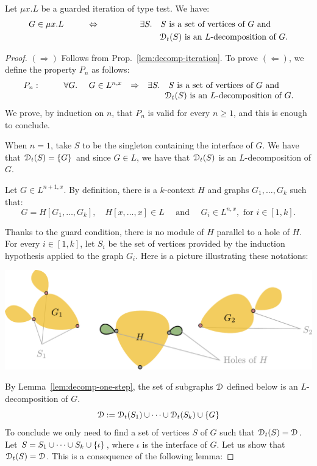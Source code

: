 \begin{proposition}\label{prop:decomp-iteration-test} Let  $\mu x. L$ be a guarded iteration of type test. We have:
$$\begin{array}{rll}
  G\in \mu x. L& \qquad\Leftrightarrow \qquad\qquad& \exists S.\quad  S \text{ is a set of vertices of $G$ and }\\[3pt]
                      &             & \qquad \ \cD_\mathsf{t}(S) \text{ is an $L$-decomposition of $G$.} 
\end{array}
$$
\end{proposition}

\begin{proof} 
 $(\Rightarrow)$ Follows from Prop.~\ref{lem:decomp-iteration}. To prove  $(\Leftarrow)$, we define the property $P_n$ as follows:
$$\begin{array}{lrll}
P_n:&\qquad\forall G.\ \quad G\in L^{n,x}& \Rightarrow& \exists S.\quad  S \text{ is a set of vertices of $G$ and }\\
 &                      &             & \qquad \cD_\mathsf{t}(S) \text{ is an $L$-decomposition of $G$.} 
\end{array}
$$
We prove, by induction on $n$, that $P_n$ is valid for every $n\geq 1$, and this is enough to conclude. 
\medskip

 When $n=1$, take $S$ to be the singleton containing the interface of $G$. We have that $\cD_\mathsf{t}(S)=\set{G}$ and since $G\in L$, we have that $\cD_\mathsf{t}(S)$ is an $L$-decomposition of $G$.
\medskip

 Let $G\in L^{n+1,x}$. By definition, there is a $k$-context $H$ and  graphs $G_1, \dots, G_k$ such that: 
$$G=H[G_1,\dots, G_k],\quad H[x,\dots,x]\in L\quad \text{ and }\quad G_i\in L^{n,x}, \text{ for } i\in[1,k].$$ 

Thanks to the guard condition, there is no module of $H$ parallel to a hole of $H$.  For every $i\in[1, k]$, let $S_i$ be the set of vertices provided by the induction hypothesis applied to the graph $G_i$. Here is a picture illustrating these notations:
\begin{center}
\includegraphics[scale=.36]{Pictures/decomp-test-proof}
\end{center}
By Lemma~\ref{lem:decomp-one-step}, the set of subgraphs $\mathcal D$ defined below is an $L$-decomposition of $G$.
 $$\cD:=\cD_\mathsf{t}(S_1)\cup\dots\cup\cD_\mathsf{t}(S_k)\cup\set{G}$$
  To conclude we only need to find a set of vertices $S$ of $G$ such that $\cD_\mathsf{t}(S)=\cD$. Let $S=S_1\cup\dots\cup S_k\cup\left\{\iota\right\}$, where $\iota$ is the interface of $G$. Let us show that $\cD_\mathsf{t}(S)=\cD$. This is a consequence of the following lemma:


\end{proof}
